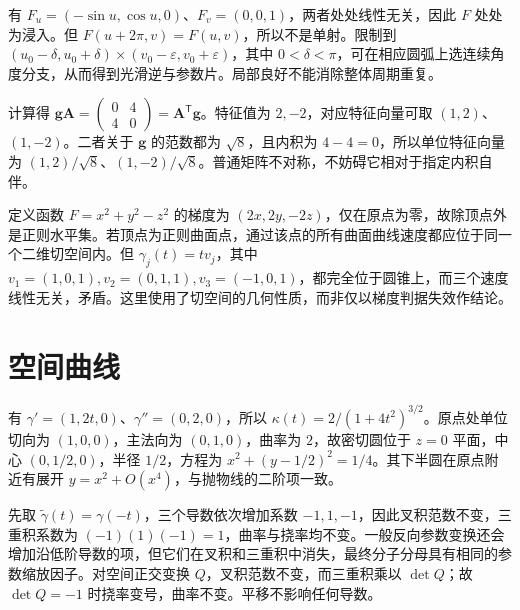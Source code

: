 \documentclass[UTF8,12pt,a4paper,fontset=fandol]{ctexbook}
\begin{document}
\begin{solve}
有 $F_u=(-\sin u,\cos u,0)$、$F_v=(0,0,1)$，两者处处线性无关，因此 $F$ 处处为浸入。但 $F(u+2\pi,v)=F(u,v)$，所以不是单射。限制到 $(u_0-\delta,u_0+\delta)\times(v_0-\varepsilon,v_0+\varepsilon)$，其中 $0<\delta<\pi$，可在相应圆弧上选连续角度分支，从而得到光滑逆与参数片。局部良好不能消除整体周期重复。
\end{solve}

\begin{solve}
计算得 $\mathbf g\mathbf A=\begin{pmatrix}0&4\\4&0\end{pmatrix}=\mathbf A^{\mathsf T}\mathbf g$。特征值为 $2,-2$，对应特征向量可取 $(1,2)$、$(1,-2)$。二者关于 $\mathbf g$ 的范数都为 $\sqrt8$，且内积为 $4-4=0$，所以单位特征向量为 $(1,2)/\sqrt8$、$(1,-2)/\sqrt8$。普通矩阵不对称，不妨碍它相对于指定内积自伴。
\end{solve}

\begin{solve}
定义函数 $F=x^2+y^2-z^2$ 的梯度为 $(2x,2y,-2z)$，仅在原点为零，故除顶点外是正则水平集。若顶点为正则曲面点，通过该点的所有曲面曲线速度都应位于同一个二维切空间内。但 $\gamma_j(t)=tv_j$，其中 $v_1=(1,0,1),v_2=(0,1,1),v_3=(-1,0,1)$，都完全位于圆锥上，而三个速度线性无关，矛盾。这里使用了切空间的几何性质，而非仅以梯度判据失效作结论。
\end{solve}

\section{空间曲线}
\begin{solve}
有 $\gamma'=(1,2t,0)$、$\gamma''=(0,2,0)$，所以 $\kappa(t)=2/(1+4t^2)^{3/2}$。原点处单位切向为 $(1,0,0)$，主法向为 $(0,1,0)$，曲率为 $2$，故密切圆位于 $z=0$ 平面，中心 $(0,1/2,0)$，半径 $1/2$，方程为 $x^2+(y-1/2)^2=1/4$。其下半圆在原点附近有展开 $y=x^2+O(x^4)$，与抛物线的二阶项一致。
\end{solve}

\begin{solve}
先取 $\widetilde\gamma(t)=\gamma(-t)$，三个导数依次增加系数 $-1,1,-1$，因此叉积范数不变，三重积系数为 $(-1)(1)(-1)=1$，曲率与挠率均不变。一般反向参数变换还会增加沿低阶导数的项，但它们在叉积和三重积中消失，最终分子分母具有相同的参数缩放因子。对空间正交变换 $Q$，叉积范数不变，而三重积乘以 $\det Q$；故 $\det Q=-1$ 时挠率变号，曲率不变。平移不影响任何导数。
\end{solve}
\end{document}
